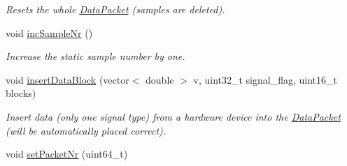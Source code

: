 \begin{DoxyCompactItemize}
\begin{DoxyCompactList}\small\item\em Resets the whole \hyperlink{class_data_packet}{DataPacket} (samples are deleted). \item\end{DoxyCompactList}\item 
\hypertarget{class_data_packet_ada10e1ebb83a49faeca732765793cfa2}{
void \hyperlink{class_data_packet_ada10e1ebb83a49faeca732765793cfa2}{incSampleNr} ()}
\label{class_data_packet_ada10e1ebb83a49faeca732765793cfa2}

\begin{DoxyCompactList}\small\item\em Increase the static sample number by one. \item\end{DoxyCompactList}\item 
void \hyperlink{class_data_packet_ab83c192471bb4d70cd21653adcc7da7f}{insertDataBlock} (vector$<$ double $>$ v, uint32\_\-t signal\_\-flag, uint16\_\-t blocks)
\begin{DoxyCompactList}\small\item\em Insert data (only one signal type) from a hardware device into the \hyperlink{class_data_packet}{DataPacket} (will be automatically placed correct). \item\end{DoxyCompactList}\item 
\hypertarget{class_data_packet_a1b2a26a56f1a1a414fdbf20c6b8aff8f}{
void \hyperlink{class_data_packet_a1b2a26a56f1a1a414fdbf20c6b8aff8f}{setPacketNr} (uint64\_\-t)}
\label{class_data_packet_a1b2a26a56f1a1a414fdbf20c6b8aff8f}


\end{DoxyCompactItemize}
